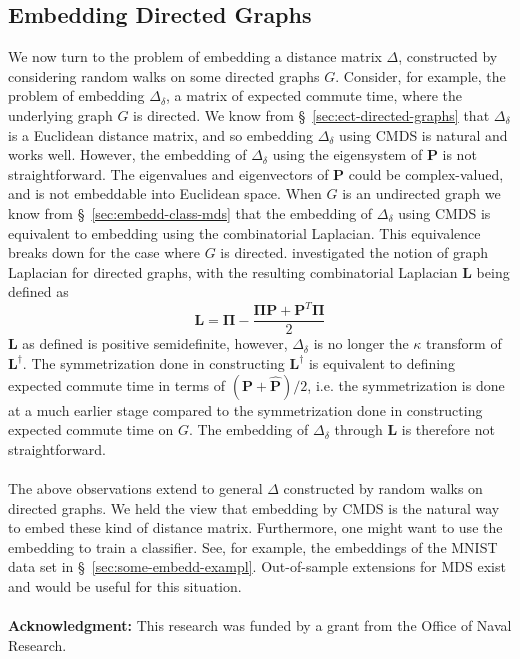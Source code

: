 \documentclass[10pt,twocolumn]{article}
\numberwithin{equation}{section}
\begin{document}
\subsection{Embedding Directed Graphs}
\label{sec:embedd-dist-direct}
We now turn to the problem of embedding a distance matrix $\Delta$,
constructed by considering random walks on some directed graphs
$G$. Consider, for example, the problem of embedding $\Delta_{\delta}$,
a matrix of expected commute time, where the underlying graph $G$ is
directed. We know from \S~\ref{sec:ect-directed-graphs} that
$\Delta_{\delta}$ is a Euclidean distance matrix, and so embedding
$\Delta_\delta$ using CMDS is natural and works
well. However, the embedding of $\Delta_\delta$ using the eigensystem
of $\mathbf{P}$ is not straightforward. The eigenvalues and
eigenvectors of $\mathbf{P}$ could be complex-valued, and is not
embeddable into Euclidean space. When $G$ is an undirected graph we
know from \S~\ref{sec:embedd-class-mds} that the
embedding of $\Delta_{\delta}$ using CMDS is equivalent to
embedding using the combinatorial Laplacian. This equivalence breaks
down for the case where $G$ is directed. \cite{chung05:_laplac_cheeg}
investigated the notion of graph Laplacian for directed graphs, with the
resulting combinatorial Laplacian $\mathbf{L}$ being defined as
\begin{equation}
  \label{eq:31}
  \mathbf{L} = \bm{\Pi} - \frac{\bm{\Pi}\mathbf{P} + \mathbf{P}^{T}\bm{\Pi}}{2}
\end{equation}
$\mathbf{L}$ as defined is positive semidefinite, however,
$\Delta_{\delta}$ is no longer the $\kappa$ transform of
$\mathbf{L}^{\dagger}$. The symmetrization done in
constructing $\mathbf{L}^{\dagger}$ is equivalent to defining 
expected commute time in terms of $(\mathbf{P} + \hat{\mathbf{P}})/2$,
i.e. the symmetrization is done at a much earlier stage compared to
the symmetrization done in constructing expected commute time on $G$.
The embedding of $\Delta_{\delta}$ through
$\mathbf{L}$ is therefore not straightforward. \\ \\
%
\noindent
The above observations extend to general $\Delta$ constructed by
random walks on directed graphs. We held the view that embedding by
CMDS is the natural way to embed these kind of distance
matrix. Furthermore, one might want to use the embedding to train a
classifier. See, for example, the embeddings of the MNIST data set in
\S~\ref{sec:some-embedd-exampl}. Out-of-sample extensions for MDS
exist and would be useful for this situation. \\ \\
%
\noindent
{\bf Acknowledgment:} This research was funded by a grant from the
Office of Naval Research.

\end{document}

